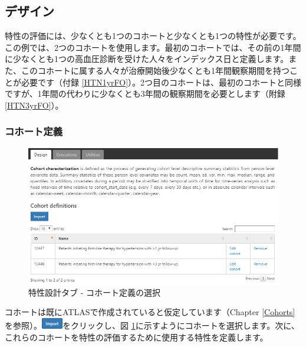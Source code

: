 \documentclass[
  11pt]{book}
\theoremstyle{definition}
\theoremstyle{definition}
\theoremstyle{definition}
\theoremstyle{definition}
\theoremstyle{remark}
\begin{document}
\subsection{デザイン}\label{ux30c7ux30b6ux30a4ux30f3}

特性の評価には、少なくとも1つのコホートと少なくとも1つの特性が必要です。この例では、2つのコホートを使用します。最初のコホートでは、その前の1年間に少なくとも1つの高血圧診断を受けた人々をインデックス日と定義します。また、このコホートに属する人々が治療開始後少なくとも1年間観察期間を持つことが必要です（付録 \ref{HTN1yrFO}）。2つ目のコホートは、最初のコホートと同様ですが、1年間の代わりに少なくとも3年間の観察期間を必要とします（附録 \ref{HTN3yrFO}）。

\subsubsection*{コホート定義}\label{ux30b3ux30dbux30fcux30c8ux5b9aux7fa9}

\begin{figure}

{\centering \includegraphics[width=1\linewidth]{images/Characterization/atlasCharacterizationCohortSelection} 

}

\caption{特性設計タブ - コホート定義の選択}\label{fig:atlasCharacterizationCohortSelection}
\end{figure}

コホートは既にATLASで作成されていると仮定しています（Chapter \ref{Cohorts}を参照）。\includegraphics{images/Characterization/atlasImportButton.png}をクリックし、図 \ref{fig:atlasCharacterizationCohortSelection}に示すようにコホートを選択します。次に、これらのコホートを特性の評価するために使用する特性を定義します。
\end{document}
